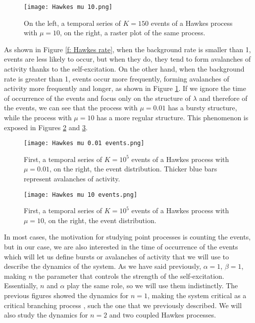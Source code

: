 \begin{figure}[H]
    \centering
    \texttt{[image: Hawkes mu 10.png]}
    \caption{On the left, a temporal series of $K=150$ events of a Hawkes process with $\mu=10$, on the right, a raster plot of the same process.}
    \label{f: Hawkes rate 2}
\end{figure}

As shown in Figure \ref{f: Hawkes rate}, when the background rate is smaller than 1, events are less likely to occur, but when they do, they tend to form avalanches of activity thanks 
to the self-excitation. On the other hand, when the background rate is greater than 1, events occur more frequently, forming avalanches of activity more frequently and longer, as
shown in Figure \ref{f: Hawkes rate 2}. If we ignore the time of occurrence of the events and focus only on the structure of $\lambda$ and therefore of the events, we can see that
the process with $\mu=0.01$ has a bursty structure, while the process with $\mu=10$ has a more regular structure. This phenomenon is exposed in Figures \ref{f: Hawkes rate burst} and
\ref{f: Hawkes rate burst 2}.

\begin{figure}[H]
    \centering
    \texttt{[image: Hawkes mu 0.01 events.png]}
    \caption{First, a temporal series of $K=10^5$ events of a Hawkes process with $\mu=0.01$, on the right, the event distribution. Thicker blue bars represent avalanches of activity.}
    \label{f: Hawkes rate burst}    
\end{figure}

\begin{figure}[H]
    \centering
    \texttt{[image: Hawkes mu 10 events.png]}
    \caption{First, a temporal series of $K=10^5$ events of a Hawkes process with $\mu=10$, on the right, the event distribution.}
    \label{f: Hawkes rate burst 2}    
\end{figure}

In most cases, the motivation for studying point processes is counting the events, but in our case, we are also interested in the time of occurrence of the events
which will let us define bursts or avalanches of activity that we will use to describe the dynamics of the system. 
As we have said previously, $\alpha = 1$, $\beta = 1$, making $n$ the parameter that controls the strength of the self-excitation. Essentially, $n$ and $\alpha$ play the same role,
so we will use them indistinctly. The previous figures showed the dynamics for $n=1$, making the system critical as a critical branching process \cite{notarmuzi2021percolation}, 
such the one that we previously described. We will also study the dynamics for $n=2$ and two coupled Hawkes processes.


